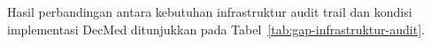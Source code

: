 Hasil perbandingan antara kebutuhan infrastruktur audit trail dan kondisi implementasi DecMed ditunjukkan pada Tabel~\ref{tab:gap-infrastruktur-audit}.
















